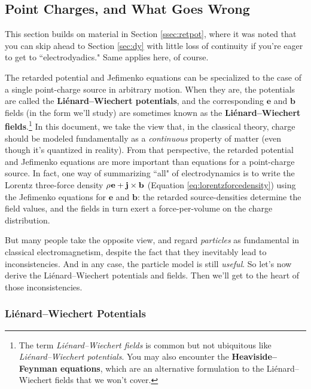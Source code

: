 \documentclass[12pt]{article}
\renewcommand{\vv}[1]{\mathbf{#1}}
\begin{document}
\subsection{Point Charges, and What Goes Wrong}\label{ssec:pointchargesources}

This section builds on material in Section \ref{ssec:retpot}, where it was noted that you can skip ahead to Section \ref{sec:dy} with little loss of continuity if you're eager to get to ``electrodyadics." Same applies here, of course.

The retarded potential and Jefimenko equations can be specialized to the case of a single point-charge source in arbitrary motion. When they are, the potentials are called the \textbf{Li\'enard--Wiechert potentials}, and the corresponding $\vv e$ and $\vv b$ fields (in the form we'll study) are sometimes known as the \textbf{Li\'enard--Wiechert fields}.\footnote{The term \emph{Li\'enard--Wiechert fields} is common but not ubiquitous like \emph{Li\'enard--Wiechert potentials}. You may also encounter the \textbf{Heaviside--Feynman equations}, which are an alternative formulation to the Li\'enard--Wiechert fields that we won't cover.} In this document, we take the view that, in the classical theory, charge should be modeled fundamentally as a \emph{continuous} property of matter (even though it's quantized in reality). From that perspective, the retarded potential and Jefimenko equations are more important than equations for a point-charge source. In fact, one way of summarizing ``all" of electrodynamics is to write the Lorentz three-force density $\rho \mkern1mu \vv e + \vv j \times \vv b$ (Equation \ref{eq:lorentzforcedensity}) using the Jefimenko equations for $\vv e$ and $\vv b$: the retarded source-densities determine the field values, and the fields in turn exert a force-per-volume on the charge distribution.

But many people take the opposite view, and regard \emph{particles} as fundamental in classical electromagnetism, despite the fact that they inevitably lead to inconsistencies. And in any case, the particle model is still \emph{useful}. So let's now derive the Li\'enard--Wiechert potentials and fields. Then we'll get to the heart of those inconsistencies.

\subsubsection{Li\'enard--Wiechert Potentials}\label{sssec:lwp}
\end{document}
